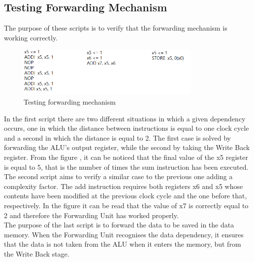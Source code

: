 \subsection{Testing Forwarding Mechanism}
The purpose of these scripts is to verify that the forwarding mechanism is working correctly. 
\begin{figure}[H]
	\centering
	\includegraphics[width=0.8\textwidth]{sec3/images/test456.png}
	\caption{Testing forwarding mechanism}
	\label{fig:test456}
\end{figure}
\noindent In the first script there are two different situations in which a given dependency occurs, one in which the distance between instructions is equal to one clock cycle and a second in which the distance is equal to 2. The first case is solved by forwarding the ALU's output register, while the second by taking the Write Back register. From the figure , it can be noticed that the final value of the x5 register is equal to 5, that is the number of times the sum instruction has been executed.\\
The second script aims to verify a similar case to the previous one adding a complexity factor. The add instruction requires both registers x6 and x5 whose contents have been modified at the previous clock cycle and the one before that, respectively. In the figure  it can be read that the value of x7 is correctly equal to 2 and therefore the Forwarding Unit has worked properly.\\
The purpose of the last script is to forward the data to be saved in the data memory. When the Forwarding Unit recognises the data dependency, it ensures that the data is not taken from the ALU when it enters the memory, but from the Write Back stage.

